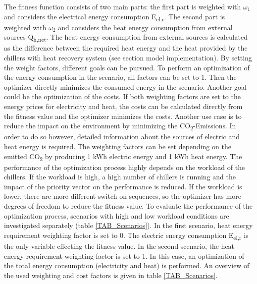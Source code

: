 \documentclass[3p,times,procedia,twocolumn,twoside]{elsarticle}
\begin{document}
The fitness function consists of two main parts: the first part is weighted with $ \omega_{1} $ and considers the electrical energy consumption E\textsubscript{el,r}. The second part is weighted with $ \omega_{2} $ and considers the heat energy consumption from external sources Q\textsubscript{h,net}. The heat energy consumption from external sources is calculated as the difference between the required heat energy and the heat provided by the chillers with heat recovery system (see section model implementation).
By setting the weight factors, different goals can be pursued. To perform an optimization of the energy consumption in the scenario, all factors can be set to 1. Then the optimizer directly minimizes the consumed energy in the scenario. Another goal could be the optimization of the costs. If both weighting factors are set to the energy prices for electricity and heat, the costs can be calculated directly from the fitness value and the optimizer minimizes the costs. Another use case is to reduce the impact on the environment by minimizing the CO\textsubscript{2}-Emissions. In order to do so however, detailed information about the sources of electric and heat energy is required. The weighting factors can be set depending on the emitted CO\textsubscript{2} by producing 1 kWh electric energy and 1 kWh heat energy.
The performance of the optimization process highly depends on the workload of the chillers. If the workload is high, a high number of chillers is running and the impact of the priority vector on the performance is reduced. If the workload is lower, there are more different switch-on sequences, so the optimizer has more degrees of freedom to reduce the fitness value. To evaluate the performance of the optimization process, scenarios with high and low workload conditions are investigated separately (table \ref{TAB_Scenarios}).
In the first scenario, heat energy requirement weighting factor is set to 0. The electric energy consumption E\textsubscript{el,r} is the only variable effecting the fitness value. In the second scenario, the heat energy requirement weighting factor is set to 1. In this case, an optimization of the total energy consumption (electricity and heat) is performed. An overview of the used weighting and cost factors is given in table \ref{TAB_Scenarios}.
\end{document}
